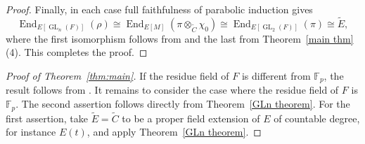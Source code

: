 \documentclass[a4paper,10pt,twoside]{amsart}
\DeclareMathOperator{\End}{End}
\DeclareMathOperator{\GL}{GL}
\theoremstyle{definition}
\numberwithin{equation}{section}
\begin{document}
\begin{proof}
Finally, in each case full faithfulness of parabolic induction gives
\[
\End_{E[\GL_n(F)]}(\rho)
\cong
\End_{E[M]}(\pi\otimes_{\widetilde C}\chi_0)
\cong
\End_{E[\GL_2(F)]}(\pi)
\cong
\widetilde E,
\]
where the first isomorphism follows from \cite[Theorem~5.3(1)]{Vig16} and the last from Theorem~\ref{main thm}\textup{(4)}.
This completes the proof.
\end{proof}


\begin{proof}[Proof of Theorem~\ref{thm:main}]
If the residue field of \(F\) is different from \(\mathbb F_p\), the
result follows from \cite[Theorem~1.1]{Le24}. It remains to consider
the case where the residue field of \(F\) is \(\mathbb F_p\). The second assertion follows directly from
Theorem~\ref{GLn theorem}. For the first assertion, take
\(\widetilde E=\widetilde C\) to be a proper field extension of \(E\)
of countable degree, for instance \(E(t)\), and apply
Theorem~\ref{GLn theorem}.
\end{proof}
\end{document}
